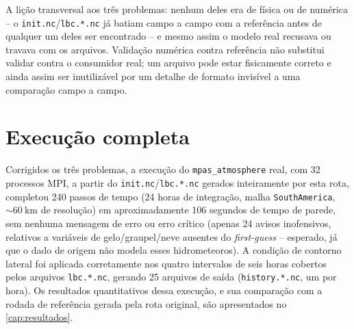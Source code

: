 A lição transversal aos três problemas: nenhum deles era de física ou de
numérica -- o \texttt{init.nc}/\texttt{lbc.*.nc} já batiam campo a campo
com a referência antes de qualquer um deles ser encontrado -- e mesmo
assim o modelo real recusava ou travava com os arquivos. Validação
numérica contra referência não substitui validar contra o consumidor
real; um arquivo pode estar fisicamente correto e ainda assim ser
inutilizável por um detalhe de formato invisível a uma comparação
campo a campo.

\section{Execução completa}

Corrigidos os três problemas, a execução do \texttt{mpas\_atmosphere}
real, com 32 processos MPI, a partir do \texttt{init.nc}/\texttt{lbc.*.nc}
gerados inteiramente por esta rota, completou 240 passos de tempo (24
horas de integração, malha \texttt{SouthAmerica}, $\sim\SI{60}{\kilo\metre}$
de resolução) em aproximadamente 106 segundos de tempo de parede, sem
nenhuma mensagem de erro ou erro crítico (apenas 24 avisos inofensivos,
relativos a variáveis de gelo/graupel/neve ausentes do
\textit{first-guess} -- esperado, já que o dado de origem não modela
esses hidrometeoros). A condição de contorno lateral foi aplicada
corretamente nos quatro intervalos de seis horas cobertos pelos arquivos
\texttt{lbc.*.nc}, gerando 25 arquivos de saída
(\texttt{history.*.nc}, um por hora). Os resultados quantitativos dessa
execução, e sua comparação com a rodada de referência gerada pela rota
original, são apresentados no \cref{cap:resultados}.
